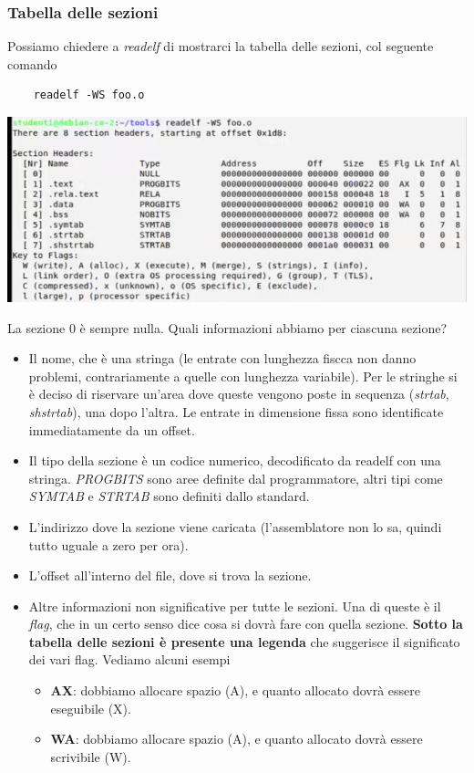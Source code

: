 \subsubsection{Tabella delle sezioni} Possiamo chiedere a \emph{readelf} di mostrarci la tabella delle sezioni, col seguente comando
\begin{verbatim}
	readelf -WS foo.o
\end{verbatim}
\begin{center}
	\includegraphics[scale=.9]{img/54.PNG}
\end{center}  
La sezione 0 è sempre nulla. Quali informazioni abbiamo per ciascuna sezione?
\begin{itemize}
	\item Il nome, che è una stringa (le entrate con lunghezza fiscca non danno problemi, contrariamente a quelle con lunghezza variabile). Per le stringhe si è deciso di riservare un'area dove queste vengono poste in sequenza (\emph{strtab}, \emph{shstrtab}), una dopo l'altra. Le entrate in dimensione fissa sono identificate immediatamente da un offset.
	\item Il tipo della sezione è un codice numerico, decodificato da readelf con una stringa. \emph{PROGBITS} sono aree definite dal programmatore, altri tipi come \emph{SYMTAB} e \emph{STRTAB} sono definiti dallo standard.
	\item L'indirizzo dove la sezione viene caricata (l'assemblatore non lo sa, quindi tutto uguale a zero per ora).
	\item L'offset all'interno del file, dove si trova la sezione.
	\item Altre informazioni non significative per tutte le sezioni. Una di queste è il \emph{flag}, che in un certo senso dice cosa si dovrà fare con quella sezione. \textbf{Sotto la tabella delle sezioni è presente una legenda} che suggerisce il significato dei vari flag. Vediamo alcuni esempi
	\begin{itemize}
		\item \textbf{AX}: dobbiamo allocare spazio (A), e quanto allocato dovrà essere eseguibile (X).
		\item \textbf{WA}: dobbiamo allocare spazio (A), e quanto allocato dovrà essere scrivibile (W).
	\end{itemize}
\end{itemize}
